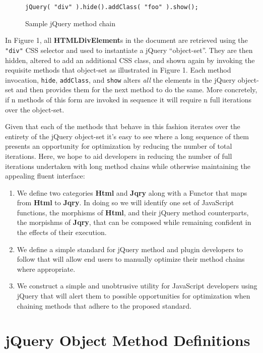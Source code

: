 \documentclass[preprint]{sigplanconf}
\begin{document}
\begin{figure}[h!]
\begin{verbatim}
jQuery( "div" ).hide().addClass( "foo" ).show();
\end{verbatim}
\nocaptionrule \caption{Sample jQuery method chain}
\end{figure}

In Figure 1, all \textbf{HTMLDivElement}s in the document are retrieved using the \verb|"div"| CSS selector and used to instantiate a jQuery ``object-set''. They are then hidden, altered to add an additional CSS class, and shown again by invoking the requisite methods that object-set as illustrated in Figure 1. Each method invocation, \verb|hide|, \verb|addClass|, and \verb|show| alters \textit{all} the elements in the jQuery object-set and then provides them for the next method to do the same. More concretely, if n methods of this form are invoked in sequence it will require n full iterations over the object-set.

Given that each of the methods that behave in this fashion iterates over the entirety of the jQuery object-set it's easy to see where a long sequence of them presents an opportunity for optimization by reducing the number of total iterations. Here, we hope to aid developers in reducing the number of full iterations undertaken with long method chains while otherwise maintaining the appealing fluent interface:

\begin{enumerate}
\item We define two categories \textbf{Html} and \textbf{Jqry} along with a Functor that maps from \textbf{Html} to \textbf{Jqry}. In doing so we will identify one set of JavaScript functions, the morphisms of \textbf{Html}, and their jQuery method counterparts, the morpishms of \textbf{Jqry}, that can be composed while remaining confident in the effects of their execution.
\item We define a simple standard for jQuery method and plugin developers to follow that will allow end users to manually optimize their method chains where appropriate.
\item We construct a simple and unobtrusive utility for JavaScript developers using jQuery that will alert them to possible opportunities for optimization when chaining methods that adhere to the proposed standard.
\end{enumerate}

\section{jQuery Object Method Definitions}
\end{document}
